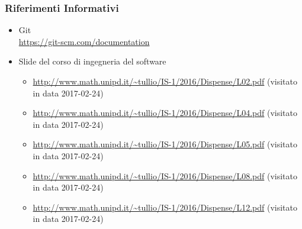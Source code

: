 	    \subsubsection{Riferimenti Informativi}
        \begin{itemize}
        \item Git \\
        \url{https://git-scm.com/documentation}
         \item Slide del corso di ingegneria del software
          \begin{itemize}
           \item \url{http://www.math.unipd.it/~tullio/IS-1/2016/Dispense/L02.pdf} (visitato in data 2017-02-24)
           \item \url{http://www.math.unipd.it/~tullio/IS-1/2016/Dispense/L04.pdf} (visitato in data 2017-02-24)
           \item \url{http://www.math.unipd.it/~tullio/IS-1/2016/Dispense/L05.pdf} (visitato in data 2017-02-24)
           \item \url{http://www.math.unipd.it/~tullio/IS-1/2016/Dispense/L08.pdf} (visitato in data 2017-02-24)
           \item \url{http://www.math.unipd.it/~tullio/IS-1/2016/Dispense/L12.pdf} (visitato in data 2017-02-24)
          \end{itemize}
        \end{itemize}
